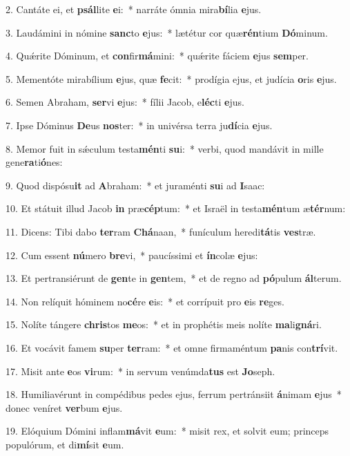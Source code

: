 2. Cantáte ei, et \textbf{psál}lite \textbf{e}i:~*  narráte ómnia mira\textbf{bí}lia \textbf{e}jus.\

3. Laudámini in nómine \textbf{sanc}to \textbf{e}jus:~*  lætétur cor quæ\textbf{rén}tium \textbf{Dó}minum.\

4. Quǽrite Dóminum, et \textbf{con}fir\textbf{má}mini:~*  quǽrite fáciem \textbf{e}jus \textbf{sem}per.\

5. Mementóte mirabílium \textbf{e}jus, quæ \textbf{fe}cit:~*  prodígia ejus, et judícia \textbf{o}ris \textbf{e}jus.\

6. Semen Abraham, \textbf{ser}vi \textbf{e}jus:~*  fílii Jacob, e\textbf{léc}ti \textbf{e}jus.\

7. Ipse Dóminus \textbf{De}us \textbf{nos}ter:~*  in univérsa terra ju\textbf{dí}cia \textbf{e}jus.\

8. Memor fuit in sǽculum testa\textbf{mén}ti \textbf{su}i:~*  verbi, quod mandávit in mille gene\textbf{ra}ti\textbf{ó}nes:\

9. Quod dispósu\textbf{it} ad \textbf{A}braham:~*  et juraménti \textbf{su}i ad \textbf{I}saac:\

10. Et státuit illud Jacob \textbf{in} præ\textbf{cép}tum:~*  et Israël in testa\textbf{mén}tum æ\textbf{tér}num:\

11. Dicens: Tibi dabo \textbf{ter}ram \textbf{Chá}naan,~*  funículum heredi\textbf{tá}tis \textbf{ves}træ.\

12. Cum essent \textbf{nú}mero \textbf{bre}vi,~*  paucíssimi et \textbf{ín}colæ \textbf{e}jus:\

13. Et pertransiérunt de \textbf{gen}te in \textbf{gen}tem,~*  et de regno ad \textbf{pó}pulum \textbf{ál}terum.\

14. Non relíquit hóminem no\textbf{cé}re \textbf{e}is:~*  et corrípuit pro \textbf{e}is \textbf{re}ges.\

15. Nolíte tángere \textbf{chris}tos \textbf{me}os:~*  et in prophétis meis nolíte \textbf{ma}li\textbf{gná}ri.\

16. Et vocávit famem \textbf{su}per \textbf{ter}ram:~*  et omne firmaméntum \textbf{pa}nis con\textbf{trí}vit.\

17. Misit ante \textbf{e}os \textbf{vi}rum:~*  in servum venúmda\textbf{tus} est \textbf{Jo}seph.\

18. Humiliavérunt in compédibus pedes ejus, ferrum pertránsiit \textbf{á}nimam \textbf{e}jus~*  donec veníret \textbf{ver}bum \textbf{e}jus.\

19. Elóquium Dómini inflam\textbf{má}vit \textbf{e}um:~*  misit rex, et solvit eum; princeps populórum, et di\textbf{mí}sit \textbf{e}um.\

